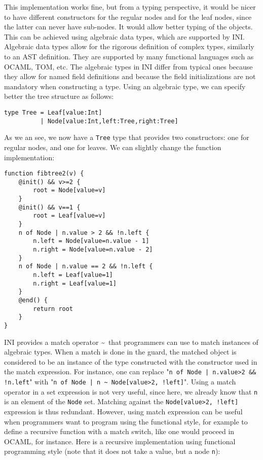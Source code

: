 \documentclass[11pt]{report}
\begin{document}
This implementation works fine, but from a typing perspective, it would be nicer to have different constructors for the regular nodes and for the leaf nodes, since the latter can never have sub-nodes. It would allow better typing of the objects. This can be achieved using algebraic data types, which are supported by INI. Algebraic data types allow for the rigorous definition of complex types, similarly to an AST definition. They are supported by many functional languages such as OCAML, TOM, etc. The algebraic types in INI differ from typical ones because they allow for named field definitions and because the field initializations are not mandatory when constructing a type. Using an algebraic type, we can specify better the tree structure as follows:

\begin{lstlisting}[numbers=none]
type Tree = Leaf[value:Int]
          | Node[value:Int,left:Tree,right:Tree]
\end{lstlisting}

As we an see, we now have a \texttt{Tree} type that provides two constructors: one for regular nodes, and one for leaves. We can slightly change the function implementation:

\begin{lstlisting}
function fibtree2(v) {
	@init() && v>=2 {
		root = Node[value=v]
	}
	@init() && v==1 {
		root = Leaf[value=v]
	}
	n of Node | n.value > 2 && !n.left {
		n.left = Node[value=n.value - 1]
		n.right = Node[value=n.value - 2]
	}
	n of Node | n.value == 2 && !n.left {
		n.left = Leaf[value=1]
		n.right = Leaf[value=1]
	}
	@end() {
		return root
	}
}
\end{lstlisting}

INI provides a match operator \~~that programmers can use to match instances of algebraic types. When a match is done in the guard, the matched object is considered to be an instance of the type constructed with the constructor used in the match expression. For instance, one can replace "\texttt{n of Node | n.value>2 \&\& !n.left}" with "\texttt{n of Node | n \~~Node[value>2, !left]}". Using a match operator in a set expression is not very useful, since here, we already know that \texttt{n} is an element of the \texttt{Node} set. Matching against the \texttt{Node[value>2, !left]} expression is thus redundant. However, using match expression can be useful when programmers want to program using the functional style, for example to define a recursive function with a match switch, like one would proceed in OCAML, for instance. Here is a recursive implementation using functional programming style (note that it does not take a value, but a node \texttt{n}):
\end{document}
